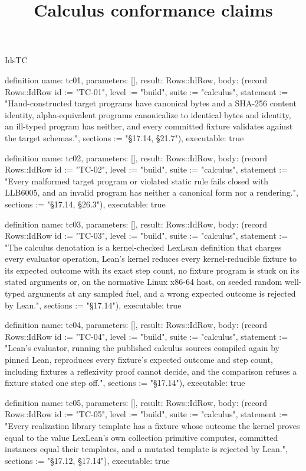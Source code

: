 \begin{lexlean}{IdsTC}
\title{Calculus conformance claims}
\begin{semanticmodule}
definition{
  name: tc01,
  parameters: [],
  result: Rows::IdRow,
  body: (record Rows::IdRow {id := "TC-01", level := "build", suite := "calculus", statement := "Hand-constructed target programs have canonical bytes and a SHA-256 content identity, alpha-equivalent programs canonicalize to identical bytes and identity, an ill-typed program has neither, and every committed fixture validates against the target schemas.", sections := "§17.14, §21.7"}),
  executable: true
}

definition{
  name: tc02,
  parameters: [],
  result: Rows::IdRow,
  body: (record Rows::IdRow {id := "TC-02", level := "build", suite := "calculus", statement := "Every malformed target program or violated static rule fails closed with LLB6005, and an invalid program has neither a canonical form nor a rendering.", sections := "§17.14, §26.3"}),
  executable: true
}

definition{
  name: tc03,
  parameters: [],
  result: Rows::IdRow,
  body: (record Rows::IdRow {id := "TC-03", level := "build", suite := "calculus", statement := "The calculus denotation is a kernel-checked LexLean definition that charges every evaluator operation, Lean's kernel reduces every kernel-reducible fixture to its expected outcome with its exact step count, no fixture program is stuck on its stated arguments or, on the normative Linux x86-64 host, on seeded random well-typed arguments at any sampled fuel, and a wrong expected outcome is rejected by Lean.", sections := "§17.14"}),
  executable: true
}

definition{
  name: tc04,
  parameters: [],
  result: Rows::IdRow,
  body: (record Rows::IdRow {id := "TC-04", level := "build", suite := "calculus", statement := "Lean's evaluator, running the published calculus sources compiled again by pinned Lean, reproduces every fixture's expected outcome and step count, including fixtures a reflexivity proof cannot decide, and the comparison refuses a fixture stated one step off.", sections := "§17.14"}),
  executable: true
}

definition{
  name: tc05,
  parameters: [],
  result: Rows::IdRow,
  body: (record Rows::IdRow {id := "TC-05", level := "build", suite := "calculus", statement := "Every realization library template has a fixture whose outcome the kernel proves equal to the value LexLean's own collection primitive computes, committed instances equal their templates, and a mutated template is rejected by Lean.", sections := "§17.12, §17.14"}),
  executable: true
}


\end{semanticmodule}
\end{lexlean}
